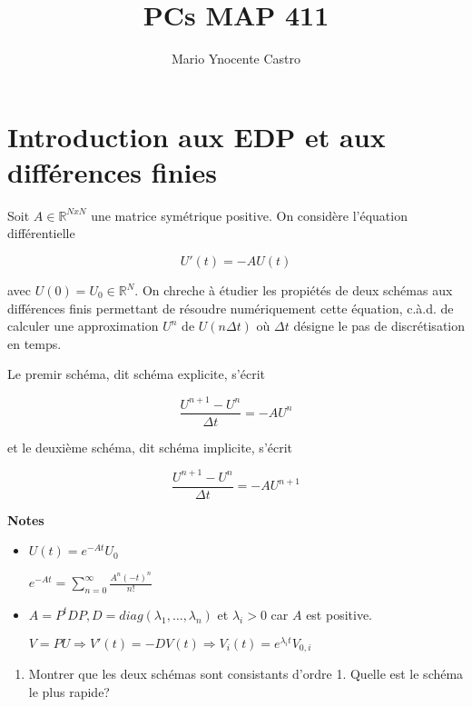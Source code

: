 \documentclass[10pt,a4paper,oneside]{article}
\newenvironment{exercice}[1][Exercice]{\begin{trivlist}
\item[\hskip \labelsep {\bfseries #1}]}{\end{trivlist}}
\begin{document}
\title{PCs MAP 411}
\author{Mario Ynocente Castro}

\maketitle

\section{Introduction aux EDP et aux différences finies}

\begin{exercice}{1}

Soit $A \in \mathbb{R}^{N x N}$ une matrice symétrique positive. On considère l'équation différentielle

\begin{equation}
U'(t) = -AU(t)
\end{equation}

avec $U(0) = U_0 \in \mathbb{R}^N$. On chreche à étudier les propiétés de deux schémas aux différences finis permettant de résoudre numériquement cette équation, c.à.d. de calculer une approximation $U^n$ de $U(n \Delta t)$ où $\Delta t$ désigne le pas de discrétisation en temps.

Le premir schéma, dit schéma explicite, s'écrit

\begin{equation}
\frac{U^{n + 1} - U^n}{\Delta t} = -A U^n
\end{equation}

et le deuxième schéma, dit schéma implicite, s'écrit

\begin{equation}
\frac{U^{n + 1} - U^n}{\Delta t} = -A U^{n + 1}
\end{equation}

\textbf{Notes}

\begin{itemize}
\item
$U(t) = e^{-At}U_0$

$e^{-At} = \sum_{n = 0}^{\infty} \frac{A^n(-t)^n}{n!}$

\item
$A = P^t D P, D = diag(\lambda_1, \ldots, \lambda_n)$ et $\lambda_i > 0$ car $A$ est positive.

$V = PU \Rightarrow V'(t) = -DV(t) \Rightarrow V_i(t) = e^{\lambda_i t}V_{0,i}$
\end{itemize}

\begin{enumerate}
\item
Montrer que les deux schémas sont consistants d'ordre 1. Quelle est le schéma le plus rapide?


\end{enumerate}
\end{exercice}
\end{document}

